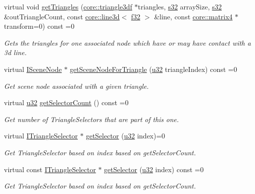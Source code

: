 \begin{DoxyCompactItemize}
virtual void \hyperlink{classirr_1_1scene_1_1ITriangleSelector_a398ca75a20cc0e44abdb13a459136720}{get\+Triangles} (\hyperlink{namespaceirr_1_1core_a1112835405bbec5dadf031dc7934e7d0}{core\+::triangle3df} $\ast$triangles, \hyperlink{namespaceirr_ac66849b7a6ed16e30ebede579f9b47c6}{s32} array\+Size, \hyperlink{namespaceirr_ac66849b7a6ed16e30ebede579f9b47c6}{s32} \&out\+Triangle\+Count, const \hyperlink{classirr_1_1core_1_1line3d}{core\+::line3d}$<$ \hyperlink{namespaceirr_a0277be98d67dc26ff93b1a6a1d086b07}{f32} $>$ \&line, const \hyperlink{namespaceirr_1_1core_a73fa92e638c5ca97efd72da307cc9b65}{core\+::matrix4} $\ast$transform=0) const =0
\begin{DoxyCompactList}\small\item\em Gets the triangles for one associated node which have or may have contact with a 3d line. \end{DoxyCompactList}\item 
virtual \hyperlink{classirr_1_1scene_1_1ISceneNode}{I\+Scene\+Node} $\ast$ \hyperlink{classirr_1_1scene_1_1ITriangleSelector_a9b180f4d9e273a6c1cda9afeb3b1c98b}{get\+Scene\+Node\+For\+Triangle} (\hyperlink{namespaceirr_a0416a53257075833e7002efd0a18e804}{u32} triangle\+Index) const =0
\begin{DoxyCompactList}\small\item\em Get scene node associated with a given triangle. \end{DoxyCompactList}\item 
virtual \hyperlink{namespaceirr_a0416a53257075833e7002efd0a18e804}{u32} \hyperlink{classirr_1_1scene_1_1ITriangleSelector_ae0d51279cab70e31a6aa2646e3b05df4}{get\+Selector\+Count} () const =0
\begin{DoxyCompactList}\small\item\em Get number of Triangle\+Selectors that are part of this one. \end{DoxyCompactList}\item 
virtual \hyperlink{classirr_1_1scene_1_1ITriangleSelector}{I\+Triangle\+Selector} $\ast$ \hyperlink{classirr_1_1scene_1_1ITriangleSelector_a51e15d33c41642441a311a33d2f1ebed}{get\+Selector} (\hyperlink{namespaceirr_a0416a53257075833e7002efd0a18e804}{u32} index)=0
\begin{DoxyCompactList}\small\item\em Get Triangle\+Selector based on index based on get\+Selector\+Count. \end{DoxyCompactList}\item 
virtual const \hyperlink{classirr_1_1scene_1_1ITriangleSelector}{I\+Triangle\+Selector} $\ast$ \hyperlink{classirr_1_1scene_1_1ITriangleSelector_ad5d221ea393e67872c902d35e77fa69e}{get\+Selector} (\hyperlink{namespaceirr_a0416a53257075833e7002efd0a18e804}{u32} index) const =0
\begin{DoxyCompactList}\small\item\em Get Triangle\+Selector based on index based on get\+Selector\+Count. \end{DoxyCompactList}\end{DoxyCompactItemize}
